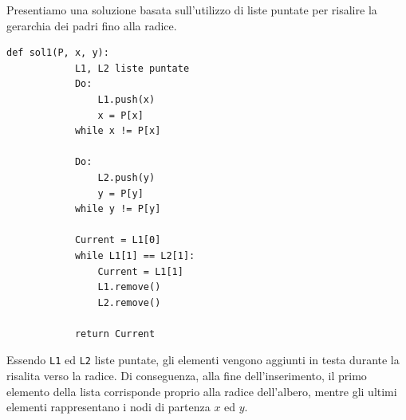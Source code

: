 \documentclass[12pt]{report}
\begin{document}
	Presentiamo una soluzione basata sull'utilizzo di liste puntate per risalire la gerarchia dei padri fino alla radice.
	
	\begin{lstlisting}[style=stile-listings]
		def sol1(P, x, y):
			L1, L2 liste puntate
			Do:
				L1.push(x)
				x = P[x]
			while x != P[x]
			
			Do:
				L2.push(y)
				y = P[y]
			while y != P[y]
			
			Current = L1[0]
			while L1[1] == L2[1]:
				Current = L1[1]
				L1.remove()
				L2.remove()
			
			return Current
	\end{lstlisting}
	
	\begin{osservazione}{}{}
		Essendo \texttt{L1} ed \texttt{L2} liste puntate, gli elementi vengono aggiunti in testa durante la risalita verso la radice. Di conseguenza, alla fine dell'inserimento, il primo elemento della lista corrisponde proprio alla radice dell'albero, mentre gli ultimi elementi rappresentano i nodi di partenza $x$ ed $y$.
	\end{osservazione}
	
\end{document}
